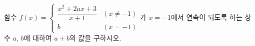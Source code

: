 함수 $f(x)=\begin{cases} \dfrac{x^2+2ax+3}{x+1} & (x\ne -1) \\ b & (x=-1) \end{cases}$가 $x=-1$에서 연속이 되도록 하는 상수 $a$, $b$에 대하여 $a+b$의 값을 구하시오.
